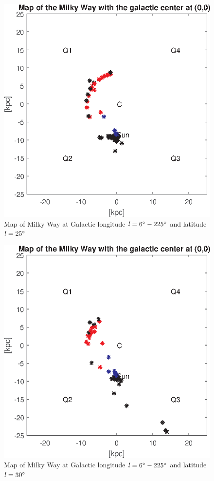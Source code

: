 \documentclass[fleqn,usenatbib]{mnras}
\begin{document}
\begin{figure}
      \includegraphics[width=\columnwidth]{Map_6}
      \caption{Map of Milky Way at Galactic longitude $\mathit{l}=6\hbox{$^\circ$}-225\hbox{$^\circ$}$ and latitude $\mathit{l}=25\hbox{$^\circ$}$}
      \label{fig:map-6}
\end{figure}

\begin{figure}
      \includegraphics[width=\columnwidth]{Map_7}
      \caption{Map of Milky Way at Galactic longitude $\mathit{l}=6\hbox{$^\circ$}-225\hbox{$^\circ$}$ and latitude $\mathit{l}=30\hbox{$^\circ$}$}
      \label{fig:map-7}
\end{figure}
\end{document}
